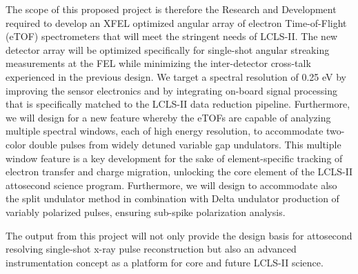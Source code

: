 The scope of this proposed project is therefore the Research and Development required to develop an XFEL optimized angular array of electron Time-of-Flight (eTOF) spectrometers that will meet the stringent needs of LCLS-II. 
The new detector array will be optimized specifically for single-shot angular streaking measurements at the FEL while minimizing the inter-detector cross-talk experienced in the previous design.
We target a spectral resolution of 0.25 eV by improving the sensor electronics and by integrating on-board signal processing that is specifically matched to the LCLS-II data reduction pipeline. 
Furthermore, we will design for a new feature whereby the eTOFs are capable of analyzing multiple spectral windows, each of high energy resolution, to accommodate two-color double pulses from widely detuned variable gap undulators. 
This multiple window feature is a key development for the sake of element-specific tracking of electron transfer and charge migration, unlocking the core element of the LCLS-II attosecond science program. 
Furthermore, we will design to accommodate also the split undulator method in combination with Delta undulator production of variably polarized pulses, ensuring sub-spike polarization analysis.

The output from this project will not only provide the design basis for attosecond resolving single-shot x-ray pulse reconstruction but also an advanced instrumentation concept as a platform for core and future LCLS-II science.





